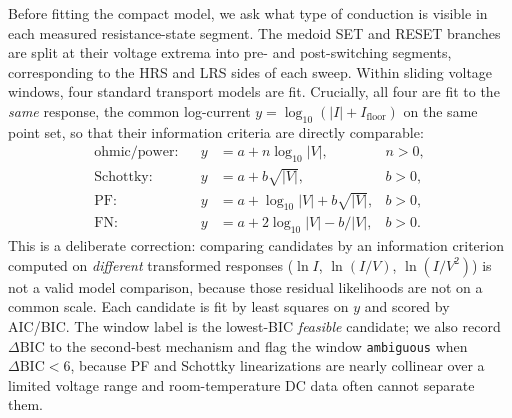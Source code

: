 \documentclass[journal]{IEEEtran}
\begin{document}
Before fitting the compact model, we ask what type of conduction is visible
in each measured resistance-state segment.  The medoid SET and RESET
branches are split at their voltage extrema into pre- and post-switching
segments, corresponding to the HRS and LRS sides of each sweep.  Within
sliding voltage windows, four standard transport models are fit.  Crucially,
all four are fit to the \emph{same} response, the common log-current
$y=\log_{10}(|I|+I_{\mathrm{floor}})$ on the same point set, so that their
information criteria are directly comparable:
\begin{align}
  \text{ohmic/power:} && y &= a + n\log_{10}|V|, & n>0, \label{eq:ohmic}\\
  \text{Schottky:}    && y &= a + b\sqrt{|V|}, & b>0, \label{eq:schottky}\\
  \text{PF:}          && y &= a + \log_{10}|V| + b\sqrt{|V|}, & b>0, \label{eq:pf}\\
  \text{FN:}          && y &= a + 2\log_{10}|V| - b/|V|, & b>0. \label{eq:fn}
\end{align}
This is a deliberate correction: comparing candidates by an information
criterion computed on \emph{different} transformed responses
($\ln I$, $\ln(I/V)$, $\ln(I/V^2)$) is not a valid model comparison, because
those residual likelihoods are not on a common scale.  Each candidate is fit
by least squares on $y$ and scored by AIC/BIC.  The window label is the
lowest-BIC \emph{feasible} candidate; we also record $\Delta\mathrm{BIC}$ to
the second-best mechanism and flag the window \texttt{ambiguous} when
$\Delta\mathrm{BIC}<6$, because PF and Schottky linearizations are nearly
collinear over a limited voltage range \cite{chiu2014} and room-temperature
DC data often cannot separate them.
\end{document}
